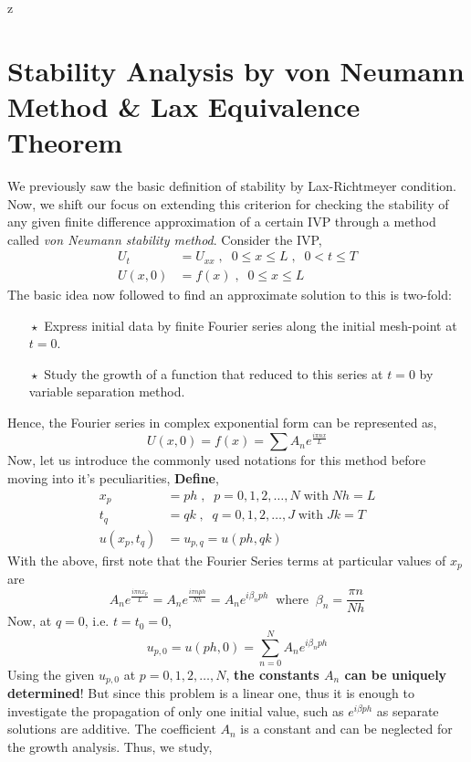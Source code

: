 z\documentclass[a4paper,12pt,twoside]{book}
\newcommand{\nll}[0]{\newline\newline}
\begin{document}
\section{Stability Analysis by von Neumann Method \& Lax Equivalence Theorem}
We previously saw the basic definition of stability by Lax-Richtmeyer condition. Now, we shift our focus on extending this criterion for checking the stability of any given finite difference approximation of a certain IVP through a method called \textit{von Neumann stability method}.
\nll
Consider the IVP,
\begin{equation}
	\begin{split}
		U_t &= U_{xx} \;,\;\;0\le x\le L\;,\;\;0<t\le T\\
		U(x,0) &= f(x) \;,\;\;0\le x\le L
	\end{split}
\end{equation}
The basic idea now followed to find an approximate solution to this is two-fold:
\begin{itemize}
	\item[$\boxed{\star}$]{Express initial data by finite Fourier series along the initial mesh-point at $t=0$.}
	\item[$\boxed{\star}$]{Study the growth of a function that reduced to this series at $t=0$ by variable separation method.}
\end{itemize}
Hence, the Fourier series in complex exponential form can be represented as,
\[U(x,0) = f(x) = \sum A_n e^{\frac{i\pi nx}{L}}\]
Now, let us introduce the commonly used notations for this method before moving into it's peculiarities,
\nll
\textbf{Define},
\begin{equation}
	\begin{split}
		x_p &= ph\;,\;\;p=0,1,2,\dots,N\;\text{with}\;Nh = L\\
		t_q &= qk\;,\;\;q=0,1,2,\dots,J\;\text{with}\;Jk = T\\
		u(x_p,t_q) &= u_{p,q} = u(ph,qk)
	\end{split}
\end{equation}
With the above, first note that the Fourier Series terms at particular values of $x_p$ are
\[A_ne^{\frac{i\pi n x_p}{L}} = A_ne^{\frac{i\pi nph}{Nh}} = A_ne^{i\beta_n ph}\;\;\text{where}\;\;\beta_n = \frac{\pi n}{Nh}\]
Now, at $q=0$, i.e. $t = t_0 = 0$,
\[u_{p,0} = u(ph,0) = \sum_{n=0}^NA_ne^{i\beta_nph}\]
Using the given $u_{p,0}$ at $p=0,1,2,\dots,N$, \textbf{the constants $A_n$ can be uniquely determined}! But since this problem is a linear one, thus it is enough to investigate the propagation of only one initial value, such as $e^{i\beta ph}$ as separate solutions are additive. The coefficient $A_n$ is a constant and can be neglected for the growth analysis. Thus, we study,
\end{document}
